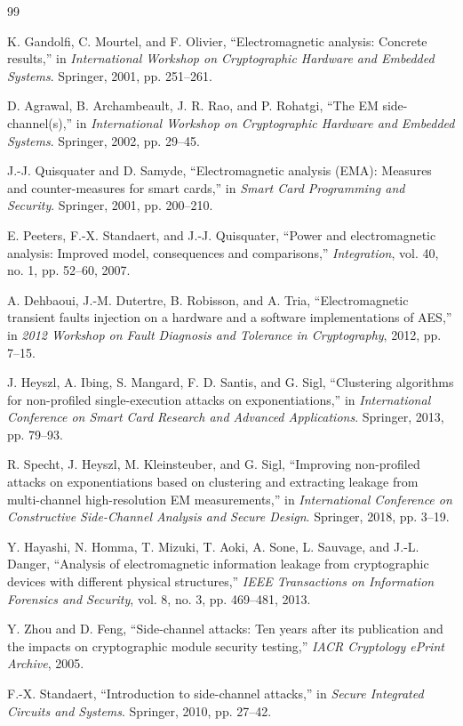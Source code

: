 \documentclass[11pt,a4paper]{article}
\theoremstyle{definition}
\begin{document}
\begin{thebibliography}{99}

K. Gandolfi, C. Mourtel, and F. Olivier, ``Electromagnetic analysis: Concrete results,'' in \textit{International Workshop on Cryptographic Hardware and Embedded Systems}. Springer, 2001, pp. 251--261.

D. Agrawal, B. Archambeault, J. R. Rao, and P. Rohatgi, ``The EM side-channel(s),'' in \textit{International Workshop on Cryptographic Hardware and Embedded Systems}. Springer, 2002, pp. 29--45.

J.-J. Quisquater and D. Samyde, ``Electromagnetic analysis (EMA): Measures and counter-measures for smart cards,'' in \textit{Smart Card Programming and Security}. Springer, 2001, pp. 200--210.

E. Peeters, F.-X. Standaert, and J.-J. Quisquater, ``Power and electromagnetic analysis: Improved model, consequences and comparisons,'' \textit{Integration}, vol. 40, no. 1, pp. 52--60, 2007.

A. Dehbaoui, J.-M. Dutertre, B. Robisson, and A. Tria, ``Electromagnetic transient faults injection on a hardware and a software implementations of AES,'' in \textit{2012 Workshop on Fault Diagnosis and Tolerance in Cryptography}, 2012, pp. 7--15.

J. Heyszl, A. Ibing, S. Mangard, F. D. Santis, and G. Sigl, ``Clustering algorithms for non-profiled single-execution attacks on exponentiations,'' in \textit{International Conference on Smart Card Research and Advanced Applications}. Springer, 2013, pp. 79--93.

R. Specht, J. Heyszl, M. Kleinsteuber, and G. Sigl, ``Improving non-profiled attacks on exponentiations based on clustering and extracting leakage from multi-channel high-resolution EM measurements,'' in \textit{International Conference on Constructive Side-Channel Analysis and Secure Design}. Springer, 2018, pp. 3--19.

Y. Hayashi, N. Homma, T. Mizuki, T. Aoki, A. Sone, L. Sauvage, and J.-L. Danger, ``Analysis of electromagnetic information leakage from cryptographic devices with different physical structures,'' \textit{IEEE Transactions on Information Forensics and Security}, vol. 8, no. 3, pp. 469--481, 2013.

Y. Zhou and D. Feng, ``Side-channel attacks: Ten years after its publication and the impacts on cryptographic module security testing,'' \textit{IACR Cryptology ePrint Archive}, 2005.

F.-X. Standaert, ``Introduction to side-channel attacks,'' in \textit{Secure Integrated Circuits and Systems}. Springer, 2010, pp. 27--42.

\end{thebibliography}
\end{document}
